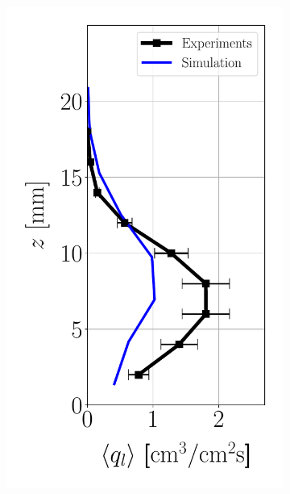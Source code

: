 \clearpage

\begin{figure}[ht]
\flushleft
\begin{subfigure}[b]{0.2\textwidth}
	\flushleft
   \includegraphics[scale=0.35]{./part2_developments/figures_ch6_lagrangian_JICF/params_OP/profiles/flux_along_z}
\end{subfigure}
\hspace*{0.5in}
\begin{subfigure}[b]{0.2\textwidth}
	\flushleft

\end{subfigure}
\end{figure}
